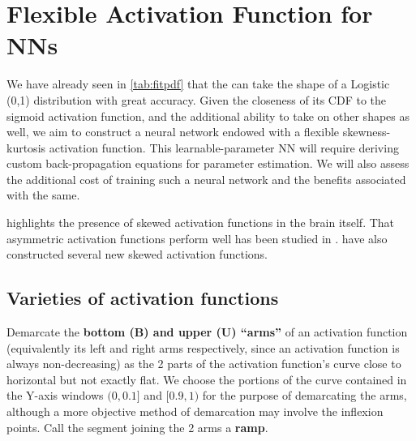 \section{Flexible Activation Function for NNs}
We have already seen in \autoref{tab:fitpdf} that the \sindist{} can take the shape of a Logistic (0,1) distribution with great accuracy. Given the closeness of its CDF to the sigmoid activation function, and the additional ability to take on other shapes as well, we aim to construct a neural network endowed with a flexible skewness-kurtosis activation function. This learnable-parameter NN will require deriving custom back-propagation equations for parameter estimation. We will also assess the additional cost of training such a neural network and the benefits associated with the same.

\cite{buzsaki2014log} highlights the presence of skewed activation functions in the brain itself. That asymmetric activation functions perform well has been studied in \cite{junior2025skew}. \cite{kuccukali2026sslu} have also constructed several new skewed activation functions.

\subsection{Varieties of activation functions}
Demarcate the \textbf{bottom (B) and upper (U) ``arms''} of an activation function (equivalently its left and right arms respectively, since an activation function is always non-decreasing) as the 2 parts of the activation function's curve close to horizontal but not exactly flat. We choose the portions of the curve contained in the Y-axis windows $(0,0.1]$ and $[0.9, 1)$ for the purpose of demarcating the arms, although a more objective method of demarcation may involve the inflexion points. Call the segment joining the 2 arms a \textbf{ramp}.

